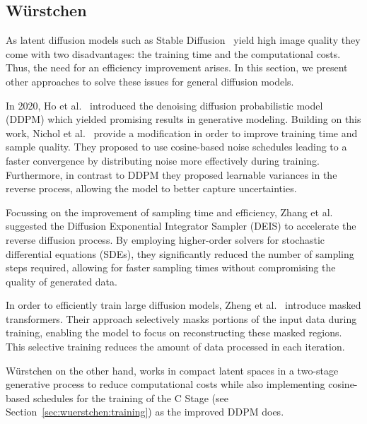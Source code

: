 \subsection{W\"urstchen}
As latent diffusion models such as Stable
Diffusion~\cite{rombach2022stablediffusion} yield high image quality they come
with two disadvantages: the training time and the computational costs. Thus,
the need for an efficiency improvement arises. In this section, we present other
approaches to solve these issues for general diffusion models.

In 2020, Ho et al.~\cite{ho2020denoisingdiffusionprobabilisticmodels} introduced
the  denoising diffusion probabilistic model (DDPM) which yielded promising
results in generative modeling. Building on this work, Nichol et
al.~\cite{Nichol2021ImprovedDenoisingDiffusionProbabilisticModels} provide a
modification in order to improve training time and sample quality. They
proposed to use cosine-based noise schedules leading to a faster
convergence by distributing noise more effectively during training.
Furthermore, in contrast to DDPM they proposed learnable variances in the
reverse process, allowing the model to better capture uncertainties.

Focussing on the improvement of sampling time and efficiency,
Zhang et al.~\cite{zhang2023fastsamplingdiffusionmodels} suggested the
Diffusion Exponential Integrator Sampler (DEIS) to accelerate the reverse
diffusion process. By employing higher-order solvers for stochastic
differential equations (SDEs), they significantly reduced the number of
sampling steps required, allowing for faster sampling times without
compromising the quality of generated data.

In order to efficiently train large diffusion models, Zheng et
al.~\cite{zheng2024fast} introduce masked transformers. Their approach
selectively masks portions of the input data during training, enabling the
model to focus on reconstructing these masked regions. This selective training
reduces the amount of data processed in each iteration.

W\"urstchen on the other hand, works in compact latent spaces in a two-stage
generative process to reduce computational costs while also implementing
cosine-based schedules for the training of the C Stage (see
Section~\ref{sec:wuerstchen:training}) as the improved DDPM does.